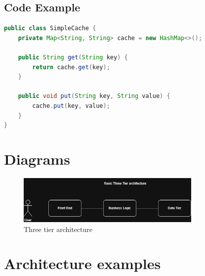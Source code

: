\documentclass[a4paper, 11pt]{book}
\begin{document}
    \section{Code Example}
    \begin{lstlisting}[language=Java, caption=Java Code for a Simple Cache]
public class SimpleCache {
    private Map<String, String> cache = new HashMap<>();

    public String get(String key) {
        return cache.get(key);
    }

    public void put(String key, String value) {
        cache.put(key, value);
    }
}
    \end{lstlisting}


    \chapter{Diagrams}

    \begin{figure}[h]
        \centering
        \includegraphics[width=0.8\textwidth]{diagrams/basic-architecture} %
        \caption{Three tier architecture}
        \label{fig:drawio-diagram}
    \end{figure}


    \chapter{Architecture examples}
\end{document}
